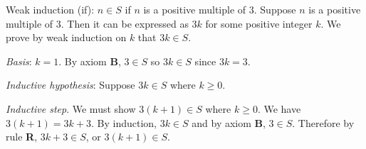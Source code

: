 \documentclass[style=sailor,size=12pt]{powerdot}
\begin{document}
\begin{wideslide}[bm=,toc=]{Weak induction}
(if): $n\in S$ if $n$ is a positive multiple of 3.
Suppose $n$ is a positive multiple of 3.
Then it can be expressed as $3k$ for some positive integer $k$.
We prove by weak induction on $k$ that $3k\in S$.

\vspace{1em}
{\em Basis\/}: $k=1$.  By axiom {\bf B}, $3\in S$ so $3k\in S$
since $3k = 3$.

\vspace{1em}
{\em Inductive hypothesis\/}:  Suppose $3k\in S$ where $k\geq 0$.

\vspace{1em}
{\em Inductive step}.
We must show $3(k+1)\in S$ where $k\geq 0$.
We have $3(k+1) = 3k + 3$.
By induction, $3k\in S$ and by axiom {\bf B}, $3\in S$.
Therefore by rule {\bf R}, $3k + 3\in S$, or $3(k+1)\in S$.
\end{wideslide}
\end{document}
